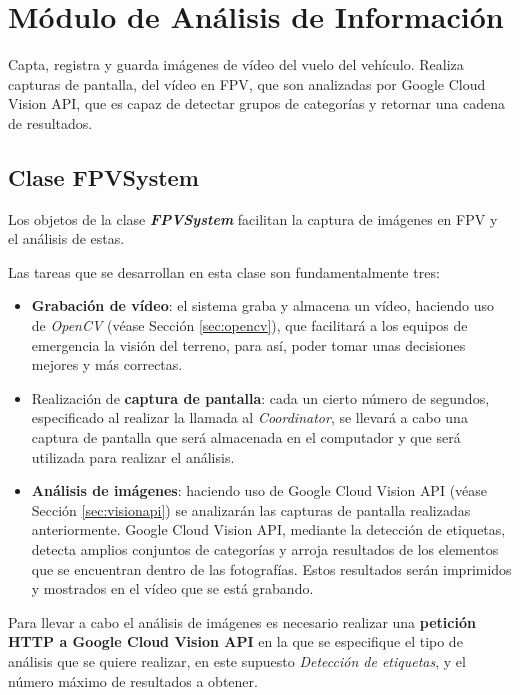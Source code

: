 \section{Módulo de Análisis de Información}

Capta, registra y guarda imágenes de vídeo del vuelo del vehículo. Realiza capturas de pantalla, del vídeo en \acs{FPV}, que son analizadas por Google Cloud Vision \acs{API}, que es capaz de detectar grupos de categorías y retornar una cadena de resultados.

\subsection{Clase FPVSystem}

Los objetos de la clase \textbf{\textit{FPVSystem}} facilitan la captura de imágenes en \acs{FPV} y el análisis de estas.

Las tareas que se desarrollan en esta clase son fundamentalmente tres:
\begin{itemize}
\item \textbf{Grabación de vídeo}: el sistema graba y almacena un vídeo, haciendo uso de \textit{OpenCV} (véase Sección \ref{sec:opencv}), que facilitará a los equipos de emergencia la visión del terreno, para así, poder tomar unas decisiones mejores y más correctas.
\item Realización de \textbf{captura de pantalla}: cada un cierto número de segundos, especificado al realizar la llamada al \textit{Coordinator}, se llevará a cabo una captura de pantalla que será almacenada en el computador y que será utilizada para realizar el análisis.
\item \textbf{Análisis de imágenes}: haciendo uso de Google Cloud Vision \acs{API} (véase Sección \ref{sec:visionapi}) se analizarán las capturas de pantalla realizadas anteriormente. Google Cloud Vision \acs{API}, mediante la detección de etiquetas, detecta amplios conjuntos de categorías y arroja resultados de los elementos que se encuentran dentro de las fotografías. Estos resultados serán imprimidos y mostrados en el vídeo que se está grabando.
\end{itemize}

Para llevar a cabo el análisis de imágenes es necesario realizar una \textbf{petición \acs{HTTP} a Google Cloud Vision \acs{API}} en la que se especifique el tipo de análisis que se quiere realizar, en este supuesto \textit{Detección de etiquetas}, y el número máximo de resultados a obtener.

